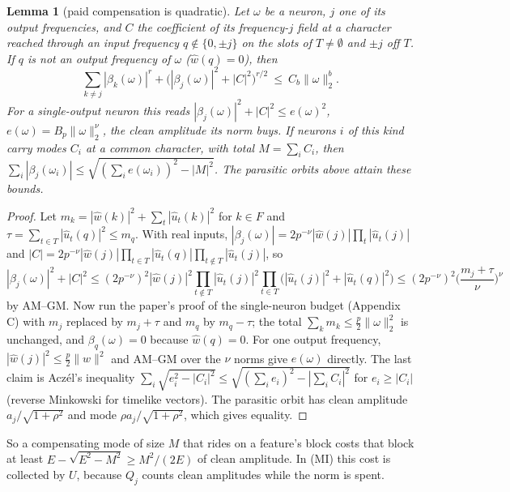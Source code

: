 \documentclass[11pt]{article}
\newtheorem{lemma}[theorem]{Lemma}
\theoremstyle{definition}
\begin{document}
\begin{lemma}[paid compensation is quadratic]\label{lem:lorentz}
Let $\omega$ be a neuron, $j$ one of its output frequencies, and $C$ the coefficient of its frequency-$j$ field at a character reached
through an input frequency $q\notin\{0,\pm j\}$ on the slots of $T\neq\emptyset$ and $\pm j$ off $T$.  If $q$ is not an output frequency of
$\omega$ ($\hat w(q)=0$), then
\[\sum_{k\ne j}|\beta_k(\omega)|^r+\big(|\beta_j(\omega)|^2+|C|^2\big)^{r/2}\ \le\ C_b\|\omega\|_2^b .\]
For a single-output neuron this reads $|\beta_j(\omega)|^2+|C|^2\le e(\omega)^2$, $e(\omega)=B_p\|\omega\|_2^\nu$, the clean amplitude its
norm buys.  If neurons $i$ of this kind carry modes $C_i$ at a common character, with total $M=\sum_iC_i$, then
$\sum_i|\beta_j(\omega_i)|\le\sqrt{(\sum_ie(\omega_i))^2-|M|^2}$.  The parasitic orbits above attain these bounds.
\end{lemma}
\begin{proof}
Let $m_k=|\hat w(k)|^2+\sum_t|\hat u_t(k)|^2$ for $k\in F$ and $\tau=\sum_{t\in T}|\hat u_t(q)|^2\le m_q$.  With real inputs,
$|\beta_j(\omega)|=2p^{-\nu}|\hat w(j)|\prod_t|\hat u_t(j)|$ and $|C|=2p^{-\nu}|\hat w(j)|\prod_{t\in T}|\hat u_t(q)|\prod_{t\notin T}|\hat u_t(j)|$, so
\[|\beta_j(\omega)|^2+|C|^2\le(2p^{-\nu})^2|\hat w(j)|^2\prod_{t\notin T}|\hat u_t(j)|^2\prod_{t\in T}\big(|\hat u_t(j)|^2+|\hat u_t(q)|^2\big)\le(2p^{-\nu})^2\Big(\frac{m_j+\tau}{\nu}\Big)^{\nu}\]
by AM--GM.  Now run the paper's proof of the single-neuron budget (Appendix C) with $m_j$ replaced by $m_j+\tau$ and $m_q$ by $m_q-\tau$; the
total $\sum_km_k\le\frac p2\|\omega\|_2^2$ is unchanged, and $\beta_q(\omega)=0$ because $\hat w(q)=0$.  For one output frequency,
$|\hat w(j)|^2\le\frac p2\|w\|^2$ and AM--GM over the $\nu$ norms give $e(\omega)$ directly.  The last claim is Acz\'el's inequality
$\sum_i\sqrt{e_i^2-|C_i|^2}\le\sqrt{(\sum_ie_i)^2-|\sum_iC_i|^2}$ for $e_i\ge|C_i|$ (reverse Minkowski for timelike vectors).  The parasitic
orbit has clean amplitude $a_j/\sqrt{1+\rho^2}$ and mode $\rho a_j/\sqrt{1+\rho^2}$, which gives equality.
\end{proof}
So a compensating mode of size $M$ that rides on a feature's block costs that block at least $E-\sqrt{E^2-M^2}\ge M^2/(2E)$ of clean
amplitude.  In (MI) this cost is collected by $U$, because $Q_j$ counts clean amplitudes while the norm is spent.
\end{document}
